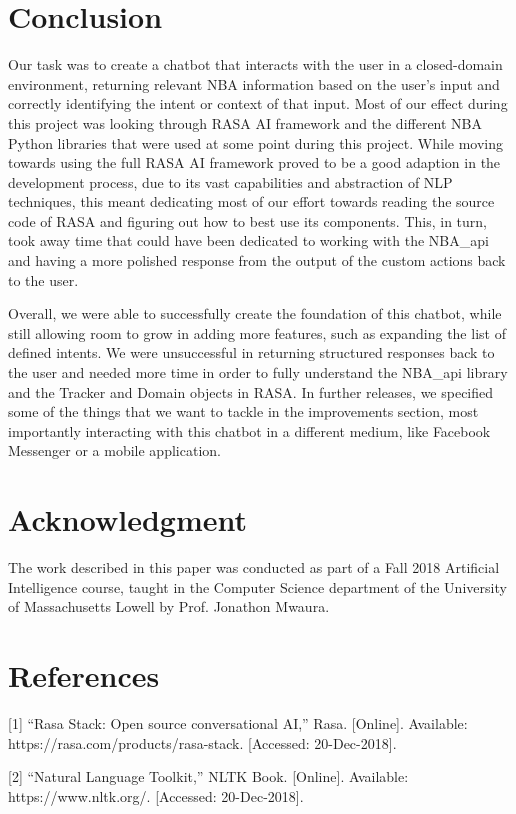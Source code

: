 \documentclass[conference]{IEEEtran}
\begin{document}
\section*{Conclusion}
Our task was to create a chatbot that interacts with the user in a closed-domain environment, returning relevant NBA information based on the user's input and correctly identifying the intent or context of that input. Most of our effect during this project was looking through RASA AI framework and the different NBA Python libraries that were used at some point during this project. While moving towards using the full RASA AI framework proved to be a good adaption in the development process, due to its vast capabilities and abstraction of NLP techniques, this meant dedicating most of our effort towards reading the source code of RASA and figuring out how to best use its components. This, in turn, took away time that could have been dedicated to working with the NBA\_api and having a more polished response from the output of the custom actions back to the user. 

Overall, we were able to successfully create the foundation of this chatbot, while still allowing room to grow in adding more features, such as expanding the list of defined intents. We were unsuccessful in returning structured responses back to the user and needed more time in order to fully understand the NBA\_api library and the Tracker and Domain objects in RASA. In further releases, we specified some of the things that we want to tackle in the improvements section, most importantly interacting with this chatbot in a different medium, like Facebook Messenger or a mobile application.

\section*{Acknowledgment}
The work described in this paper was conducted as part of a Fall 2018 Artificial Intelligence course, taught in the Computer Science department of the University of Massachusetts Lowell by Prof. Jonathon Mwaura.


\section*{References}
[1] 	“Rasa Stack: Open source conversational AI,” Rasa. [Online]. Available: https://rasa.com/products/rasa-stack. [Accessed: 20-Dec-2018].

[2] 	“Natural Language Toolkit,” NLTK Book. [Online]. Available: https://www.nltk.org/. [Accessed: 20-Dec-2018].
\end{document}
